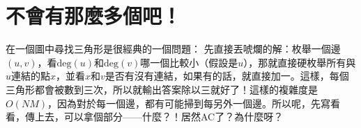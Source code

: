 \section{不會有那麼多個吧！}
	在一個圖中尋找三角形是很經典的一個問題：
	先直接丟唬爛的解：枚舉一個邊$(u, v)$，看$\text{deg}(u)$和$\text{deg}(v)$哪一個比較小（假設是$u$），那就直接硬枚舉所有與$u$連結的點$x$，並看$x$和$v$是否有沒有連結，如果有的話，就直接加一。這樣，每個三角形都會被數到三次，所以就輸出答案除以三就好了！這樣的複雜度是$O(NM)$，因為對於每一個邊，都有可能掃到每另外一個邊。所以呢，先寫看看，傳上去，可以拿個部分——什麼？！居然AC了？為什麼呀？
